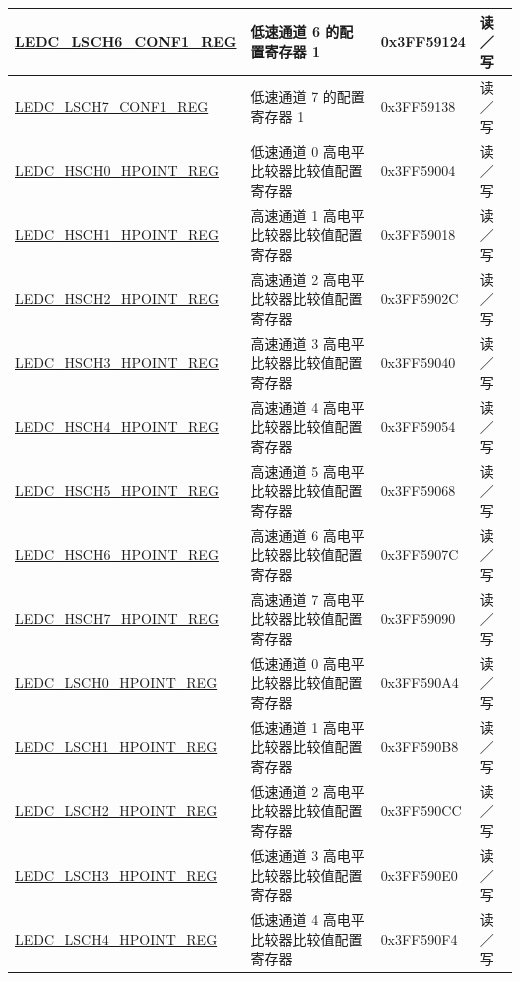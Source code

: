 \begin{longtable}{ | p{5cm} | p{7cm} | p{2.2cm} | p{1.2cm} | }
\hyperref[regdesc:LEDCLSCHnCONF1REG]{LEDC\_LSCH6\_CONF1\_REG} & 低速通道 6 的配置寄存器 1 & 0x3FF59124 & 读／写 \\ \hline
\hyperref[regdesc:LEDCLSCHnCONF1REG]{LEDC\_LSCH7\_CONF1\_REG} & 低速通道 7 的配置寄存器 1 & 0x3FF59138 & 读／写\\ \hline
\hyperref[regdesc:LEDCHSCHnHPOINTREG]{LEDC\_HSCH0\_HPOINT\_REG} & 低速通道 0 高电平比较器比较值配置寄存器 & 0x3FF59004 & 读／写\\ \hline
\hyperref[regdesc:LEDCHSCHnHPOINTREG]{LEDC\_HSCH1\_HPOINT\_REG} & 高速通道 1 高电平比较器比较值配置寄存器 & 0x3FF59018 & 读／写\\ \hline
\hyperref[regdesc:LEDCHSCHnHPOINTREG]{LEDC\_HSCH2\_HPOINT\_REG} & 高速通道 2 高电平比较器比较值配置寄存器 & 0x3FF5902C & 读／写\\ \hline
\hyperref[regdesc:LEDCHSCHnHPOINTREG]{LEDC\_HSCH3\_HPOINT\_REG} & 高速通道 3 高电平比较器比较值配置寄存器 & 0x3FF59040 & 读／写\\ \hline
\hyperref[regdesc:LEDCHSCHnHPOINTREG]{LEDC\_HSCH4\_HPOINT\_REG} & 高速通道 4 高电平比较器比较值配置寄存器 & 0x3FF59054 & 读／写\\ \hline
\hyperref[regdesc:LEDCHSCHnHPOINTREG]{LEDC\_HSCH5\_HPOINT\_REG} & 高速通道 5 高电平比较器比较值配置寄存器 & 0x3FF59068 & 读／写\\ \hline
\hyperref[regdesc:LEDCHSCHnHPOINTREG]{LEDC\_HSCH6\_HPOINT\_REG} & 高速通道 6 高电平比较器比较值配置寄存器 & 0x3FF5907C & 读／写\\ \hline
\hyperref[regdesc:LEDCHSCHnHPOINTREG]{LEDC\_HSCH7\_HPOINT\_REG} & 高速通道 7 高电平比较器比较值配置寄存器 & 0x3FF59090 & 读／写\\ \hline
\hyperref[regdesc:LEDCLSCHnHPOINTREG]{LEDC\_LSCH0\_HPOINT\_REG} & 低速通道 0 高电平比较器比较值配置寄存器 & 0x3FF590A4 & 读／写\\ \hline
\hyperref[regdesc:LEDCLSCHnHPOINTREG]{LEDC\_LSCH1\_HPOINT\_REG} & 低速通道 1 高电平比较器比较值配置寄存器 & 0x3FF590B8 & 读／写\\ \hline
\hyperref[regdesc:LEDCLSCHnHPOINTREG]{LEDC\_LSCH2\_HPOINT\_REG} & 低速通道 2 高电平比较器比较值配置寄存器 & 0x3FF590CC & 读／写\\ \hline
\hyperref[regdesc:LEDCLSCHnHPOINTREG]{LEDC\_LSCH3\_HPOINT\_REG} & 低速通道 3 高电平比较器比较值配置寄存器 & 0x3FF590E0 & 读／写\\ \hline
\hyperref[regdesc:LEDCLSCHnHPOINTREG]{LEDC\_LSCH4\_HPOINT\_REG} & 低速通道 4 高电平比较器比较值配置寄存器 & 0x3FF590F4 & 读／写\\ \hline

\end{longtable}
